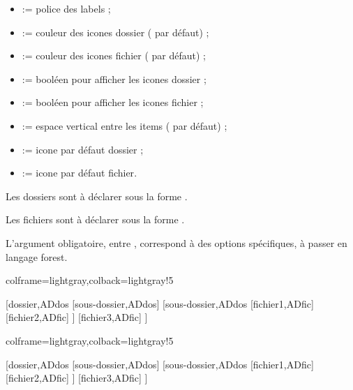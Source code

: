 \documentclass[11pt,a4paper]{ltxdoc}
\begin{document}
\begin{itemize}
	\item {} := police des labels ;
	\item {} := couleur des icones \textsf{dossier} ( par défaut) ;
	\item {} := couleur des icones \textsf{fichier} ( par défaut) ;
	\item {} := booléen pour afficher les icones \textsf{dossier} ;
	\item {} := booléen pour afficher les icones \textsf{fichier} ;
	\item {} := espace vertical entre les items (\MontreCode{0.15em} par défaut) ;
	\item {} := icone par défaut \textsf{dossier} ;
	\item {} := icone par défaut \textsf{fichier}.
\end{itemize}

\medskip

Les \textsf{dossiers} sont à déclarer sous la forme .

Les \textsf{fichiers} sont à déclarer sous la forme .

\medskip

L'argument obligatoire, entre , correspond à des options spécifiques, à passer en langage \textsf{forest}.

\begin{tcblisting}{colframe=lightgray,colback=lightgray!5}
\begin{ArborDossiers}{}
    [dossier,ADdos
        [sous-dossier,ADdos]
        [sous-dossier,ADdos
            [fichier1,ADfic]
            [fichier2,ADfic]
        ]
        [fichier3,ADfic]
    ]
\end{ArborDossiers}
\end{tcblisting}

\begin{tcblisting}{colframe=lightgray,colback=lightgray!5}
\begin{ArborDossiers}%
    [Police=\sffamily,CoulIcoD=yellow!50!pink,AffIcoF,CoulIcoF=teal,EspaceV=0.5em]%
    {}
    [dossier,ADdos
        [sous-dossier,ADdos]
        [sous-dossier,ADdos
            [fichier1,ADfic]
            [fichier2,ADfic]
        ]
        [fichier3,ADfic]
    ]
\end{ArborDossiers}
\end{tcblisting}
\end{document}

